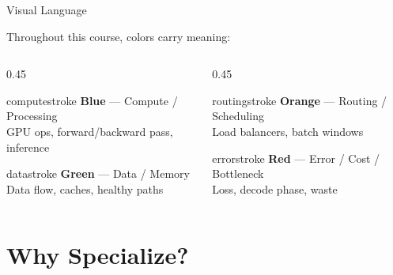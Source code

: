 \documentclass[aspectratio=169, 12pt]{beamer}
\begin{document}
\begin{frame}{Visual Language}

\small
Throughout this course, colors carry meaning:

\vspace{0.3cm}
\begin{columns}[T]
  \begin{column}{0.45\textwidth}
    \begin{mlsyscard}{computestroke}
    \textbf{Blue} --- Compute / Processing\\
    {\footnotesize GPU ops, forward/backward pass, inference}
    \end{mlsyscard}
    \vspace{0.15cm}
    \begin{mlsyscard}{datastroke}
    \textbf{Green} --- Data / Memory\\
    {\footnotesize Data flow, caches, healthy paths}
    \end{mlsyscard}
  \end{column}
  \begin{column}{0.45\textwidth}
    \begin{mlsyscard}{routingstroke}
    \textbf{Orange} --- Routing / Scheduling\\
    {\footnotesize Load balancers, batch windows}
    \end{mlsyscard}
    \vspace{0.15cm}
    \begin{mlsyscard}{errorstroke}
    \textbf{Red} --- Error / Cost / Bottleneck\\
    {\footnotesize Loss, decode phase, waste}
    \end{mlsyscard}
  \end{column}
\end{columns}
\end{frame}


\section{Why Specialize?}
\end{document}
